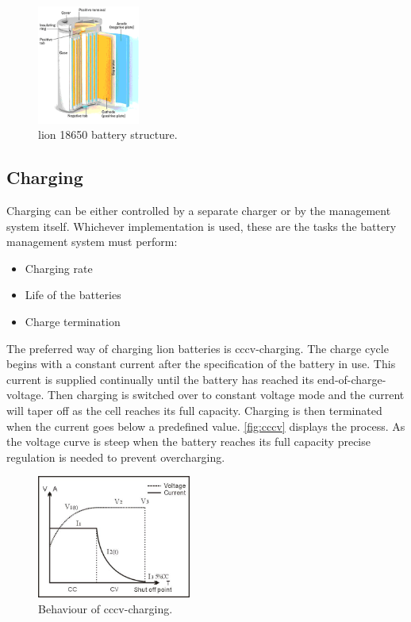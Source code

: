 \begin{figure}[H]
	\centering
	\includegraphics[width=0.3\textwidth]{Figures/cellstruct.png}
	\caption{\gls{lion} 18650 battery structure.}
	\label{fig:cellstruct}
\end{figure}

\subsection{Charging}

Charging can be either controlled by a separate charger or by the management system itself. Whichever implementation is used, these are the tasks the battery management system must perform\cite[p.111]{book}:

\begin{itemize}[noitemsep]
	\item Charging rate
	\item Life of the batteries
	\item Charge termination
\end{itemize}

The preferred way of charging \gls{lion} batteries is \gls{cccv}-charging. The charge cycle begins with a constant current after the specification of the battery in use. This current is supplied continually until the battery has reached its end-of-charge-voltage. Then charging is switched over to constant voltage mode and the current will taper off as the cell reaches its full capacity. Charging is then terminated when the current goes below a predefined value. \autoref{fig:cccv} displays the process\cite{cccv}. As the voltage curve is steep when the battery reaches its full capacity precise regulation is needed to prevent overcharging\cite[p.111-112]{book}.

\begin{figure}[H]
	\centering
	\includegraphics[width=0.45\textwidth]{Figures/cccv.jpg}
	\caption{Behaviour of \gls{cccv}-charging.}
	\label{fig:cccv}
\end{figure}

